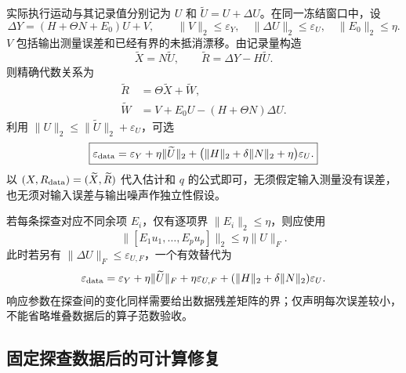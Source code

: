 \documentclass[11pt,a4paper]{article}
\numberwithin{equation}{section}
\theoremstyle{definition}
\begin{document}
实际执行运动与其记录值分别记为 $U$ 和
$\widetilde U=U+\Delta U$。在同一冻结窗口中，设
\begin{equation}
 \Delta Y=(H+\Theta N+E_0)U+V,\qquad
 \|V\|_2\le\varepsilon_Y,\quad
 \|\Delta U\|_2\le\varepsilon_U,\quad
 \|E_0\|_2\le\eta .
 \label{rev:eq:measured-input-model}
\end{equation}
$V$ 包括输出测量误差和已经有界的未抵消漂移。由记录量构造
\begin{equation}
 \widetilde X=N\widetilde U,\qquad
 \widetilde R=\Delta Y-H\widetilde U .
 \label{rev:eq:measured-data}
\end{equation}
则精确代数关系为
\begin{align}
 \widetilde R
 &=\Theta\widetilde X+\widetilde W,\\
 \widetilde W
 &=V+E_0U-(H+\Theta N)\Delta U .
 \label{rev:eq:input-error-residual}
\end{align}
利用 $\|U\|_2\le\|\widetilde U\|_2+\varepsilon_U$，可选
\begin{equation}
 \boxed{
 \varepsilon_{\rm data}
 =
 \varepsilon_Y+\eta\|\widetilde U\|_2
 +\big(\|H\|_2+\delta\|N\|_2+\eta\big)\varepsilon_U .
 }
 \label{rev:eq:input-error-budget}
\end{equation}
以 $(X,R_{\rm data})=(\widetilde X,\widetilde R)$ 代入估计和 $q$ 的公式即可，无须假定输入测量没有误差，也无须对输入误差与输出噪声作独立性假设。

若每条探查对应不同余项 $E_i$，仅有逐项界 $\|E_i\|_2\le\eta$，则应使用
\begin{equation}
 \|[E_1u_1,\ldots,E_pu_p]\|_2
 \le\eta\|U\|_F .
 \label{rev:eq:varying-remainder-bound}
\end{equation}
此时若另有 $\|\Delta U\|_F\le\varepsilon_{U,F}$，一个有效替代为
\begin{equation}
 \varepsilon_{\rm data}
 =
 \varepsilon_Y+\eta\|\widetilde U\|_F
 +\eta\varepsilon_{U,F}
 +(\|H\|_2+\delta\|N\|_2)\varepsilon_U .
 \label{rev:eq:varying-remainder-budget}
\end{equation}
响应参数在探查间的变化同样需要给出数据残差矩阵的界；仅声明每次误差较小，不能省略堆叠数据后的算子范数验收。

\subsection{固定探查数据后的可计算修复}
\end{document}
